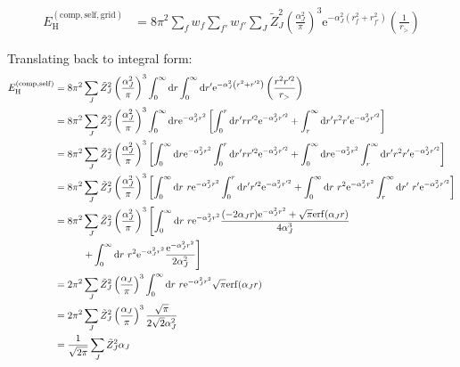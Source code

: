\documentclass[paper=a4, fontsize=11pt]{article} %
\numberwithin{equation}{section} %
\numberwithin{figure}{section} %
\numberwithin{table}{section} %
\newcommand{\rself}{{\mathrm{self}}}
\newcommand{\re}{{\mathrm{e}}}
\newcommand{\rerf}{{\mathrm{erf}}}
\newcommand{\rd}{{\mathrm{d}}}
\newcommand{\rH}{{\mathrm{H}}}
\newcommand{\rcomp}{{\mathrm{comp}}}
\newcommand{\rgrid}{{\mathrm{grid}}}
\newcommand{\al}{{\alpha}}
\begin{document}
\begin{equation}
\begin{split}
E_{\rH}^{(\rcomp,\rself,\rgrid)}
&= 8\pi^2\sum_f w_f \sum_{f'} w_{f'} \sum_J \tilde Z_J^2 \left(\frac{\al_J^2}{\pi}\right)^3 \re^{-\al_J^2 \left(r_f^2+r_{f'}^2\right)} \left( \frac{1}{r_{>}} \right)
\end{split}
\end{equation}

Translating back to integral form:
\begin{equation}
\begin{split}
E_{\rH}^{(\rcomp,\rself)}
&= 8\pi^2 \sum_J \tilde Z_J^2 \left(\frac{\al_J^2}{\pi}\right)^3  \int_0^\infty \rd r \int_0^\infty \rd r' \re^{-\al_J^2 \left(r^2+r'^2\right)} \left( \frac{r^2 r'^2}{r_{>}} \right)\\
&= 8\pi^2 \sum_J \tilde Z_J^2 \left(\frac{\al_J^2}{\pi}\right)^3  \int_0^\infty \rd r \re^{-\al_J^2 r^2} \left[ \int_0^r \rd r' r r'^2 \re^{-\al_J^2 r'^2}+ \int_r^\infty \rd r' r^2 r' \re^{-\al_J^2 r'^2} \right]\\
&= 8\pi^2 \sum_J \tilde Z_J^2 \left(\frac{\al_J^2}{\pi}\right)^3 \left[  \int_0^\infty \rd r \re^{-\al_J^2 r^2} \int_0^r \rd r' r r'^2 \re^{-\al_J^2 r'^2}+  \int_0^\infty \rd r \re^{-\al_J^2 r^2} \int_r^\infty \rd r' r^2 r' \re^{-\al_J^2 r'^2} \right]\\
&= 8\pi^2 \sum_J \tilde Z_J^2 \left(\frac{\al_J^2}{\pi}\right)^3 \left[  \int_0^\infty \rd r\ r \re^{-\al_J^2 r^2} \int_0^r \rd r' r'^2 \re^{-\al_J^2 r'^2}+  \int_0^\infty \rd r\ r^2 \re^{-\al_J^2 r^2} \int_r^\infty \rd r'\ r' \re^{-\al_J^2 r'^2} \right]\\
&= 8\pi^2 \sum_J \tilde Z_J^2 \left(\frac{\al_J^2}{\pi}\right)^3 \left[  \int_0^\infty \rd r\ r \re^{-\al_J^2 r^2} \frac{(-2 \al_J r)\re^{-\al_J^2 r^2} + \sqrt{\pi} \rerf(\al_J r)}{4 \al_J^3}\right.\\  
&\left. \hspace{10mm}+ \int_0^\infty \rd r\ r^2 \re^{-\al_J^2 r^2} \frac{\re^{-\al_J^2 r^2}}{2 \al_J^2} \right]\\
&= 2\pi^2 \sum_J \tilde Z_J^2 \left(\frac{\al_J}{\pi}\right)^3 \int_0^\infty \rd r\ r \re^{-\al_J^2 r^2} \sqrt{\pi} \rerf(\al_J r) \\
&= 2\pi^2 \sum_J \tilde Z_J^2 \left(\frac{\al_J}{\pi}\right)^3 \frac{\sqrt{\pi}}{2\sqrt{2}\al_J^2} \\
&= \frac{1}{\sqrt{2\pi}} \sum_J \tilde Z_J^2 \al_J
\end{split}
\end{equation}
\end{document}
